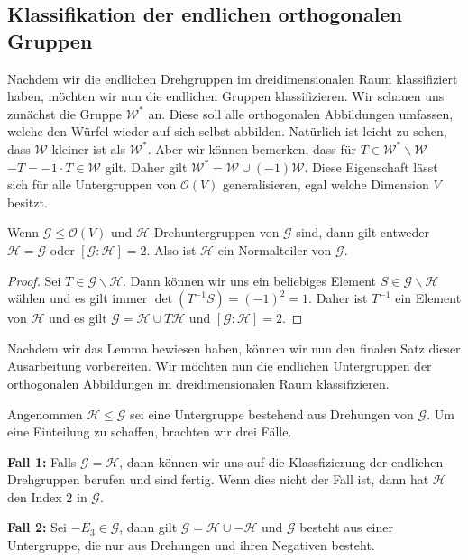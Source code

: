 \subsection{Klassifikation der endlichen orthogonalen Gruppen}
Nachdem wir die endlichen Drehgruppen im dreidimensionalen Raum klassifiziert haben, möchten wir nun die endlichen Gruppen klassifizieren. Wir schauen uns zunächst die Gruppe $\mathcal{W}^*$ an. Diese soll alle orthogonalen Abbildungen umfassen, welche den Würfel wieder auf sich selbst abbilden. Natürlich ist leicht zu sehen, dass $\mathcal{W}$ kleiner ist als $\mathcal{W}^*$. Aber wir können bemerken, dass für $T \in \mathcal{W}^*\backslash\mathcal{W}$ \ $-T = -1 \cdot T \in \mathcal{W}$ gilt. Daher gilt $\mathcal{W}^*=\mathcal{W}\cup(-1)\mathcal{W}$.
Diese Eigenschaft lässt sich für alle Untergruppen von $\mathcal{O}(V)$ generalisieren, egal welche Dimension $V$ besitzt.

\begin{lemma}
    Wenn $\mathcal{G} \leq \mathcal{O}(V)$ und $\mathcal{H}$ Drehuntergruppen von $\mathcal{G}$ sind, dann gilt entweder $\mathcal{H}=\mathcal{G}$ oder $[\mathcal{G}:\mathcal{H}] = 2$. Also ist $\mathcal{H}$ ein Normalteiler von $\mathcal{G}$.
\end{lemma}
\begin{proof}
    Sei $T \in \mathcal{G}\backslash\mathcal{H}$. Dann können wir uns ein beliebiges Element $S\in\mathcal{G}\backslash\mathcal{H}$ wählen und es gilt immer $\det(T^{-1}S) = (-1)^2=1$. Daher ist $T^{-1}$ ein Element von $\mathcal{H}$ und es gilt $\mathcal{G} = \mathcal{H} \cup T\mathcal{H}$ und $[\mathcal{G}:\mathcal{H}]=2$.
\end{proof}
Nachdem wir das Lemma bewiesen haben, können wir nun den finalen Satz dieser Ausarbeitung vorbereiten. Wir möchten nun die endlichen Untergruppen der orthogonalen Abbildungen im dreidimensionalen Raum klassifizieren.

Angenommen $\mathcal{H} \leq \mathcal{G}$ sei eine Untergruppe bestehend aus Drehungen von $\mathcal{G}$. Um eine Einteilung zu schaffen, brachten wir drei Fälle.


 \textbf{Fall 1:} Falls $\mathcal{G} = \mathcal{H}$, dann können wir uns auf die Klassfizierung der endlichen Drehgruppen berufen und sind fertig. Wenn dies nicht der Fall ist, dann hat $\mathcal{H}$ den Index $2$ in $\mathcal{G}$.


 \textbf{Fall 2:} Sei $-E_3 \in \mathcal{G}$, dann gilt $\mathcal{G} = \mathcal{H} \cup - \mathcal{H}$ und $\mathcal{G}$ besteht aus einer Untergruppe, die nur aus Drehungen und ihren Negativen besteht.


